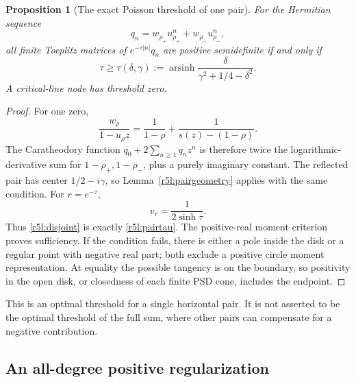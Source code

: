 \documentclass[11pt,a4paper]{article}
\newtheorem{proposition}[theorem]{Proposition}
\theoremstyle{definition}\newtheorem{definition}[theorem]{Definition}
\theoremstyle{remark}\newtheorem{remark}[theorem]{Remark}
\numberwithin{equation}{section}
\begin{document}
\begin{proposition}[The exact Poisson threshold of one pair]
\label{r5l:pairthreshold}
For the Hermitian sequence
\[
 q_n=w_{\rho_+}u_{\rho_+}^n+w_{\rho_-}u_{\rho_-}^n,
\]
all finite Toeplitz matrices of $e^{-\tau|n|}q_n$ are positive
semidefinite if and only if
\begin{equation}\label{r5l:pairtau}
 \tau\ge\tau(\delta,\gamma):=
 \operatorname{arsinh}
       \frac{\delta}{\gamma^2+1/4-\delta^2}.
\end{equation}
A critical-line node has threshold zero.
\end{proposition}
\begin{proof}
For one zero,
\[
 \frac{w_\rho}{1-u_\rho z}
 =\frac1{1-\rho}+\frac1{s(z)-(1-\rho)}.
\]
The Caratheodory function $q_0+2\sum_{n\ge1}q_nz^n$ is therefore
twice the logarithmic-derivative sum for $1-\rho_+,1-\rho_-$,
plus a purely imaginary constant.  The reflected pair has center
$1/2-i\gamma$, so Lemma~\ref{r5l:pairgeometry} applies with the
same condition.  For $r=e^{-\tau}$,
\[
 v_r=\frac1{2\sinh\tau}.
\]
Thus \eqref{r5l:disjoint} is exactly \eqref{r5l:pairtau}.
The positive-real moment criterion proves sufficiency.  If the
condition fails, there is either a pole inside the disk or a
regular point with negative real part; both exclude a positive
circle moment representation.  At equality the possible tangency
is on the boundary, so positivity in the open disk, or closedness
of each finite PSD cone, includes the endpoint.
\end{proof}

This is an optimal threshold for a single horizontal pair.  It is
not asserted to be the optimal threshold of the full sum, where
other pairs can compensate for a negative contribution.

\subsection{An all-degree positive regularization}
\end{document}
